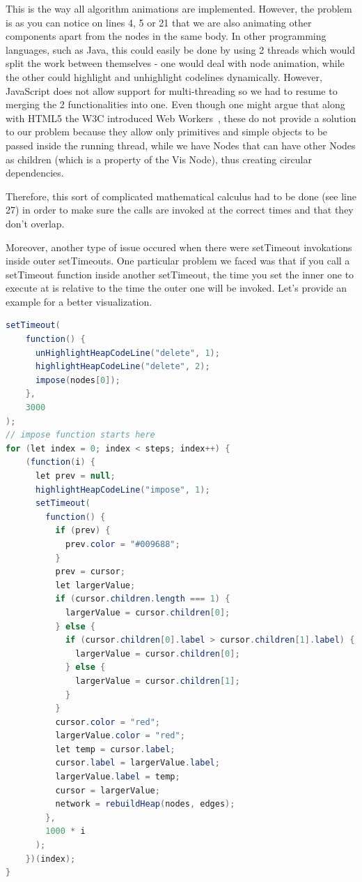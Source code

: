\documentclass{l4proj}
\begin{document}
\begin{itemize}
This is the way all algorithm animations are implemented. However, the problem is as you can notice on lines 4, 5 or 21
that we are also animating other components apart from the nodes in the same body. In other programming languages, such as Java, this
could easily be done by using 2 threads which would split the work between themselves - one would deal with node
animation, while the other could highlight and unhighlight codelines dynamically. However, JavaScript does not allow
support for multi-threading so we had to resume to merging the 2 functionalities into one. Even though one might argue
that along with HTML5 the W3C introduced Web Workers~\cite{web-worker}, these do not provide a solution to our problem
because they allow only primitives and simple objects to be passed inside the running thread, while we have Nodes that
can have other Nodes as children (which is a property of the Vis Node), thus creating circular dependencies.

Therefore, this sort of complicated mathematical calculus had to be done (see line 27) in order to make sure the calls are invoked at
the correct times and that they don't overlap. 

Moreover, another type of issue occured when there were setTimeout invokations inside outer setTimeouts. One particular
problem we faced was that if you call a setTimeout function inside another setTimeout, the time you set the inner one
to execute at is relative to the time the outer one will be invoked. Let's provide an example for a better
visualization.

\begin{lstlisting}[language=Java, caption=Heap animation that uses nested setTimeouts.]
setTimeout(
    function() {
      unHighlightHeapCodeLine("delete", 1);
      highlightHeapCodeLine("delete", 2);
      impose(nodes[0]);
    },
    3000
);
// impose function starts here
for (let index = 0; index < steps; index++) {
    (function(i) {
      let prev = null;
      highlightHeapCodeLine("impose", 1);
      setTimeout(
        function() {
          if (prev) {
            prev.color = "#009688";
          }
          prev = cursor;
          let largerValue;
          if (cursor.children.length === 1) {
            largerValue = cursor.children[0];
          } else {
            if (cursor.children[0].label > cursor.children[1].label) {
              largerValue = cursor.children[0];
            } else {
              largerValue = cursor.children[1];
            }
          }
          cursor.color = "red";
          largerValue.color = "red";
          let temp = cursor.label;
          cursor.label = largerValue.label;
          largerValue.label = temp;
          cursor = largerValue;
          network = rebuildHeap(nodes, edges);
        },
        1000 * i
      );
    })(index);
}
\end{lstlisting}


\end{itemize}
\end{document}
